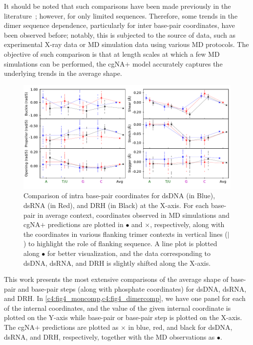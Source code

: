 It should be noted that such comparisons have been made previously in the literature~\cite{cheatham1997molecular,noy2004relative}; however, for only limited sequences. 
Therefore, some trends in the dimer sequence dependence, particularly for inter base-pair coordinates, have been observed before; notably, this is subjected to the source of data, such as experimental X-ray data or MD simulation data using various MD protocols.
The objective of such comparison is that at length scales at which a few MD simulations can be performed, the cgNA$+$ model accurately captures the underlying trends in the average shape.

\begin{figure}[H]
\begin{center}
 \centering\includegraphics[trim=0cm 0.7cm 0cm 0cm]{images/compare_mon_gs_DNA_RNA_HYB_gs.pdf}
\end{center}
\centering\caption{
Comparison of intra base-pair coordinates for dsDNA (in Blue), dsRNA (in Red), and DRH (in Black) at the X-axis. For each base-pair in average context, coordinates observed in MD simulations and cgNA$+$ predictions are plotted in $\bullet$ and $\times$, respectively, along with the coordinates in various flanking trimer contexts in vertical lines ($|$) to highlight the role of flanking sequence.
A line plot is plotted along $\bullet$ for better visualization, and the data corresponding to dsDNA, dsRNA, and DRH is slightly shifted along the X-axis.
}
\label{c4:fig4_moncomp}
\end{figure}

This work presents the most extensive comparisons of the average shape of base-pair and base-pair steps (along with phosphate coordinates) for dsDNA, dsRNA, and DRH. In \cref{c4:fig4_moncomp,c4:fig4_dimercomp}, we have one panel for each of the internal coordinates, and the value of the given internal coordinate is plotted on the Y-axis while base-pair or base-pair step is plotted on the X-axis. 
The cgNA$+$ predictions are plotted as $\times$ in blue, red, and black for dsDNA, dsRNA, and DRH, respectively, together with the MD observations as $\bullet$.


